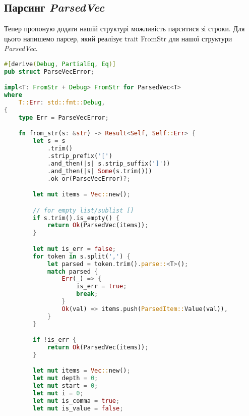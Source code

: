 \newpage
\subsection{Парсинг \textit{ParsedVec}}
Тепер пропоную додати нашій структурі можливість парситися зі строки.
Для цього напишемо парсер, який реалізує trait FromStr для нашої структури \textit{ParsedVec}.
\begin{lstlisting}[language=Rust, style=colouredRust]
#[derive(Debug, PartialEq, Eq)]
pub struct ParseVecError;

impl<T: FromStr + Debug> FromStr for ParsedVec<T>
where
    T::Err: std::fmt::Debug,
{
    type Err = ParseVecError;

    fn from_str(s: &str) -> Result<Self, Self::Err> {
        let s = s
            .trim()
            .strip_prefix('[')
            .and_then(|s| s.strip_suffix(']'))
            .and_then(|s| Some(s.trim()))
            .ok_or(ParseVecError)?;

        let mut items = Vec::new();

        // for empty list/sublist []
        if s.trim().is_empty() {
            return Ok(ParsedVec(items));
        }

        let mut is_err = false;
        for token in s.split(',') {
            let parsed = token.trim().parse::<T>();
            match parsed {
                Err(_) => {
                    is_err = true;
                    break;
                }
                Ok(val) => items.push(ParsedItem::Value(val)),
            }
        }

        if !is_err {
            return Ok(ParsedVec(items));
        }

        let mut items = Vec::new();
        let mut depth = 0;
        let mut start = 0;
        let mut i = 0;
        let mut is_comma = true;
        let mut is_value = false;


\end{lstlisting}
